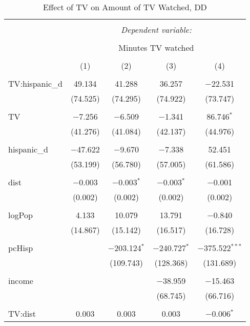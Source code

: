 
\begin{table}[!htbp] \centering 
  \caption{Effect of TV on Amount of TV Watched, DD} 
  \label{} 
\begin{tabular}{@{\extracolsep{-5pt}}lcccc} 
\\[-1.8ex]\hline 
\hline \\[-1.8ex] 
 & \multicolumn{4}{c}{\textit{Dependent variable:}} \\ 
\cline{2-5} 
\\[-1.8ex] & \multicolumn{4}{c}{Minutes TV watched} \\ 
\\[-1.8ex] & (1) & (2) & (3) & (4)\\ 
\hline \\[-1.8ex] 
 TV:hispanic\_d & 49.134 & 41.288 & 36.257 & $-$22.531 \\ 
  & (74.525) & (74.295) & (74.922) & (73.747) \\ 
  & & & & \\ 
 TV & $-$7.256 & $-$6.509 & $-$1.341 & 86.746$^{*}$ \\ 
  & (41.276) & (41.084) & (42.137) & (44.976) \\ 
  & & & & \\ 
 hispanic\_d & $-$47.622 & $-$9.670 & $-$7.338 & 52.451 \\ 
  & (53.199) & (56.780) & (57.005) & (61.586) \\ 
  & & & & \\ 
 dist & $-$0.003 & $-$0.003$^{*}$ & $-$0.003$^{*}$ & $-$0.001 \\ 
  & (0.002) & (0.002) & (0.002) & (0.002) \\ 
  & & & & \\ 
 logPop & 4.133 & 10.079 & 13.791 & $-$0.840 \\ 
  & (14.867) & (15.142) & (16.517) & (16.728) \\ 
  & & & & \\ 
 pcHisp &  & $-$203.124$^{*}$ & $-$240.727$^{*}$ & $-$375.522$^{***}$ \\ 
  &  & (109.743) & (128.368) & (131.689) \\ 
  & & & & \\ 
 income &  &  & $-$38.959 & $-$15.463 \\ 
  &  &  & (68.745) & (66.716) \\ 
  & & & & \\ 
 TV:dist & 0.003 & 0.003 & 0.003 & $-$0.006$^{*}$ \\ 

\end{tabular}
\end{table}
